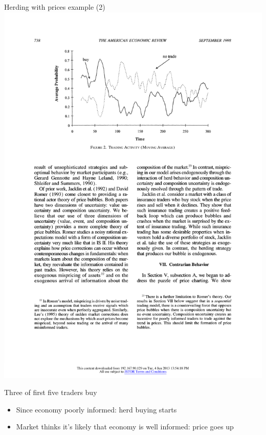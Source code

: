 \documentclass[english,10pt
,aspectratio=169
]{beamer}
\begin{document}
\begin{frame}{Herding with prices example (2)}
	\includegraphics[width=0.12\paperwidth]{pics/Trade1} \hfill \hfill
	
	Three of first five traders buy  
	\begin{itemize}
		\item Since economy poorly informed: herd buying starts
		\item Market thinks it's likely that economy is well informed: price goes up
	\end{itemize}
\end{frame}
\end{document}
